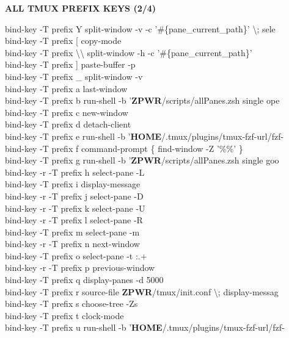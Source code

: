\documentclass[11pt,a4paper,twoside]{book}
\begin{document}
\vspace{10pt}
{\large\bfseries\color{neoncyan} ALL TMUX PREFIX KEYS (2/4)}\vspace{6pt}

bind-key  -T prefix  Y  split-window -v -c '\#\{pane\_current\_path\}' \textbackslash{}; sele\\
bind-key  -T prefix  [  copy-mode\\
bind-key  -T prefix  \textbackslash{}\textbackslash{}  split-window -h -c '\#\{pane\_current\_path\}'\\
bind-key  -T prefix  ]  paste-buffer -p\\
bind-key  -T prefix  \_  split-window -v\\
bind-key  -T prefix  a  last-window\\
bind-key  -T prefix  b  run-shell -b '\textbf{ZPWR}/scripts/allPanes.zsh single ope\\
bind-key  -T prefix  c  new-window\\
bind-key  -T prefix  d  detach-client\\
bind-key  -T prefix  e  run-shell -b '\textbf{HOME}/.tmux/plugins/tmux-fzf-url/fzf-\\
bind-key  -T prefix  f  command-prompt \{ find-window -Z '\%\%' \}\\
bind-key  -T prefix  g  run-shell -b '\textbf{ZPWR}/scripts/allPanes.zsh single goo\\
bind-key -r -T prefix  h  select-pane -L\\
bind-key  -T prefix  i  display-message\\
bind-key -r -T prefix  j  select-pane -D\\
bind-key -r -T prefix  k  select-pane -U\\
bind-key -r -T prefix  l  select-pane -R\\
bind-key  -T prefix  m  select-pane -m\\
bind-key -r -T prefix  n  next-window\\
bind-key  -T prefix  o  select-pane -t :.+\\
bind-key -r -T prefix  p  previous-window\\
bind-key  -T prefix  q  display-panes -d 5000\\
bind-key  -T prefix  r  source-file \textbf{ZPWR}/tmux/init.conf \textbackslash{}; display-messag\\
bind-key  -T prefix  s  choose-tree -Zs\\
bind-key  -T prefix  t  clock-mode\\
bind-key  -T prefix  u  run-shell -b '\textbf{HOME}/.tmux/plugins/tmux-fzf-url/fzf-\\
\end{document}
